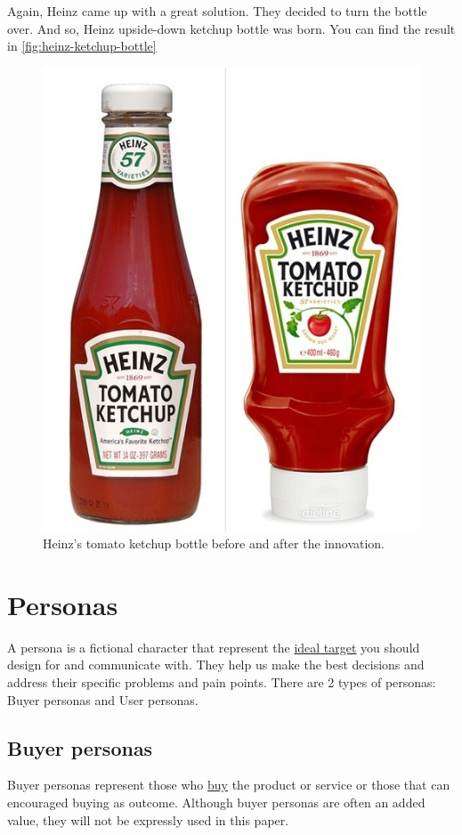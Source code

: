Again, Heinz came up with a great solution. They decided to turn the bottle over. And so,  Heinz upside-down ketchup bottle was born.
You can find the result in \autoref{fig:heinz-ketchup-bottle}

\begin{figure}[h!]
\centering
\includegraphics[scale=0.2]{figures/ketchup.png}
\caption{Heinz's tomato ketchup bottle before and after the innovation.}
\label{fig:heinz-ketchup-bottle}
\end{figure}

\section{Personas}
    A persona is a fictional character that represent the \underline{ideal target} you should design for and communicate with. They help us make the best decisions and address their specific problems and pain points. There are 2 types of personas: Buyer personas and User personas. 
    
    \subsection{Buyer personas}
    Buyer personas represent those who \underline{buy} the product or service or those that can encouraged buying as outcome. Although buyer personas are often an added value, they will not be expressly used in this paper.
    
